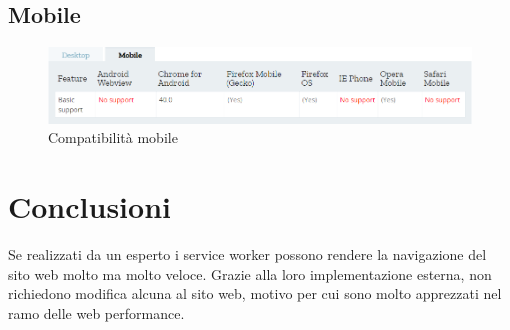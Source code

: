 \documentclass[11pt ,a4paper , twoside , openright ]{article}
\begin{document}
\subsection{Mobile}
\begin{figure}[h]
	\centering
	\includegraphics[width=1\linewidth]{CompMobile}
	\caption{Compatibilità mobile}
	\label{fig:Compatibilità mobile}
\end{figure}
\newpage
\section{Conclusioni}
Se realizzati da un esperto i service worker possono rendere la navigazione del sito web molto ma molto veloce. Grazie alla loro implementazione esterna, non richiedono modifica alcuna al sito web, motivo per cui sono molto apprezzati nel ramo delle web performance.
\end{document}
